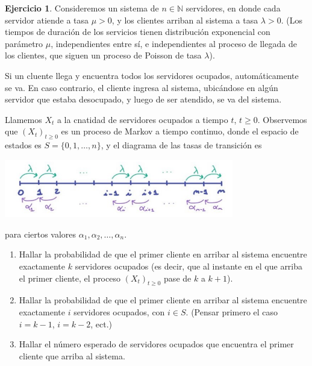 \documentclass{article}
\newcommand{\naturalnum}{\mathbb{N}}
\theoremstyle{definition}
\newtheorem{exercise}{Ejercicio}
\begin{document}
\begin{exercise}
Consideremos un sistema de $n \in \naturalnum$ servidores, en donde cada servidor atiende a tasa $\mu > 0$, y los clientes arriban al sistema a tasa $\lambda > 0$.
(Los tiempos de duración de los servicios tienen distribución exponencial con parámetro $\mu$, independientes entre sí, e independientes al proceso de llegada de los clientes, que siguen un proceso de Poisson de tasa $\lambda$).

Si un cluente llega y encuentra todos los servidores ocupados, automáticamente se va.
En caso contrario, el cliente ingresa al sistema, ubicándose en algún servidor que estaba desocupado, y luego de ser atendido, se va del sistema.

Llamemos $X_t$ a la cnatidad de servidores ocupados a tiempo $t$, $t \geq 0$.
Observemos que $(X_t)_{t \geq 0}$ es un proceso de Markov a tiempo continuo, donde el espacio de estados es $S = \{0, 1, \dots, n\}$, y el diagrama de las tasas de transición es
\begin{center}
\includegraphics[width=0.75\textwidth]{diagrama_de_las_tasas_de_transicion}
\end{center}
para ciertos valores $\alpha_1, \alpha_2, \dots, \alpha_n$.
\begin{enumerate}[label=\roman*.]
	\item Hallar la probabilidad de que el primer cliente en arribar al sistema encuentre exactamente $k$ servidores ocupados (es decir, que al instante en el que arriba el primer cliente, el proceso $(X_t)_{t \geq 0}$ pase de $k$ a $k + 1$).
	\item Hallar la probabilidad de que el primer cliente en arribar al sistema encuentre exactamente $i$ servidores ocupados, con $i \in S$.
(Pensar primero el caso $i = k - 1$, $i = k - 2$, ect.)
	\item Hallar el número esperado de servidores ocupados que encuentra el primer cliente que arriba al sistema.
\end{enumerate}
\end{exercise}
\end{document}

